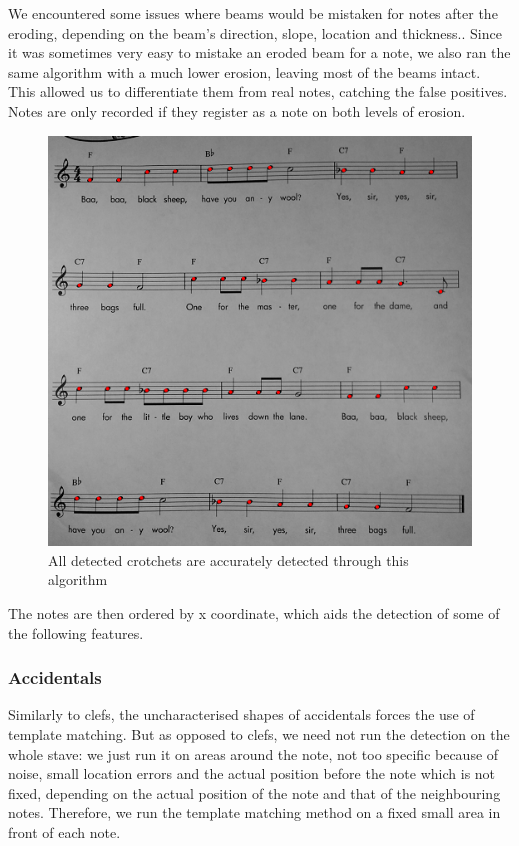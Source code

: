 We encountered some issues where beams would be mistaken for notes after the eroding, depending on the beam's direction, slope, location and thickness.. Since it was sometimes very easy to mistake an eroded beam for a note, we also ran the same algorithm with a much lower erosion, leaving most of the beams intact. This allowed us to differentiate them from real notes,
catching the false positives. Notes are only recorded if they register as a note on both levels of erosion.

\begin{figure}[ht!]
    \centering
    \includegraphics[width=1\textwidth]{./assets/crotchetsdetected.png}
    \caption{All detected crotchets are accurately detected through this algorithm}
    \label{image:crotchetsdetected}
\end{figure}

The notes are then ordered by x coordinate, which aids the detection of some of the following features.

\subsubsection{Accidentals}

Similarly to clefs, the uncharacterised shapes of accidentals forces the use of template matching. But as opposed to clefs, we need not run the detection on the whole stave: we just run it on areas around the note, not too specific because of noise, small location errors and the actual position before the note which is not fixed, depending on the actual
position of the note and that of the neighbouring notes. Therefore, we run the template matching method on a fixed small area in front of each note.

